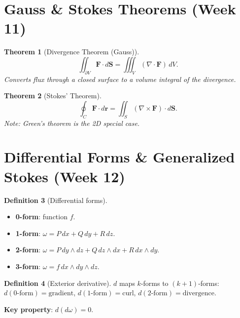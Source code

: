 \documentclass[12pt,a4paper]{article}
\newtheorem{theorem}{Theorem}[section]
\theoremstyle{definition}
\newtheorem{definition}[theorem]{Definition}
\theoremstyle{remark}
\begin{document}
\section{Gauss \& Stokes Theorems (Week 11)}

\begin{theorem}[Divergence Theorem (Gauss)]
\[
  \iint_{\partial V} \mathbf{F}\cdot d\mathbf{S} = \iiint_V (\nabla\cdot\mathbf{F})\,dV.
\]
Converts flux through a closed surface to a volume integral of the divergence.
\end{theorem}

\begin{theorem}[Stokes' Theorem]
\[
  \oint_C \mathbf{F}\cdot d\mathbf{r} = \iint_S (\nabla\times\mathbf{F})\cdot d\mathbf{S}.
\]
\textit{Note}: Green's theorem is the 2D special case.
\end{theorem}

\section{Differential Forms \& Generalized Stokes (Week 12)}

\begin{definition}[Differential forms]
\begin{itemize}
  \item \textbf{0-form}: function $f$.
  \item \textbf{1-form}: $\omega = P\,dx+Q\,dy+R\,dz$.
  \item \textbf{2-form}: $\omega = P\,dy\wedge dz + Q\,dz\wedge dx + R\,dx\wedge dy$.
  \item \textbf{3-form}: $\omega = f\,dx\wedge dy\wedge dz$.
\end{itemize}
\end{definition}

\begin{definition}[Exterior derivative]
$d$ maps $k$-forms to $(k{+}1)$-forms:
$d(\text{0-form})=\text{gradient}$, $d(\text{1-form})=\text{curl}$, $d(\text{2-form})=\text{divergence}$.

\textbf{Key property}: $d(d\omega)=0$.
\end{definition}
\end{document}
